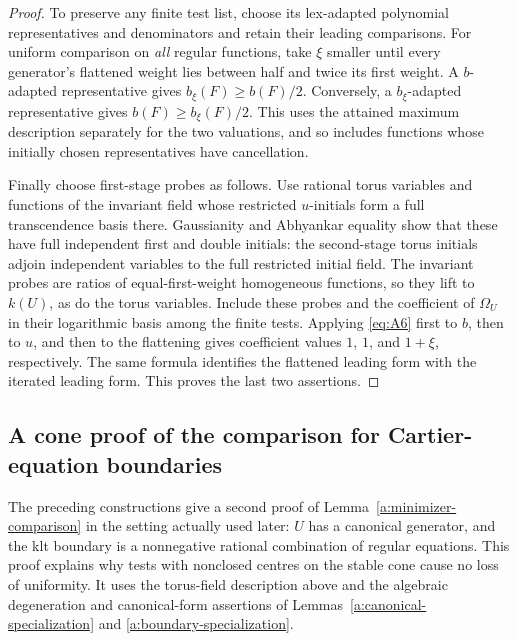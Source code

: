 \begin{proof}
To preserve any finite test list, choose its lex-adapted polynomial
representatives and denominators and retain their leading comparisons.
For uniform comparison on \emph{all} regular functions, take \(\xi\)
smaller until every generator's flattened weight lies between half and
twice its first weight. A \(b\)-adapted representative gives
\(b_\xi(F)\geq b(F)/2\). Conversely, a \(b_\xi\)-adapted
representative gives \(b(F)\geq b_\xi(F)/2\). This uses the attained
maximum description separately for the two valuations, and so includes
functions whose initially chosen representatives have cancellation.

Finally choose first-stage probes as follows. Use rational torus
variables and functions of the invariant field whose restricted
\(u\)-initials form a full transcendence basis there. Gaussianity and
Abhyankar equality show that these have full independent first and
double initials: the second-stage torus initials adjoin independent
variables to the full restricted initial field. The invariant probes
are ratios of equal-first-weight homogeneous functions, so they lift
to \(k(U)\), as do the torus variables. Include these probes and the
coefficient of \(\Omega_U\) in their logarithmic basis among the finite
tests. Applying \eqref{eq:A6} first to \(b\), then to \(u\), and then
to the flattening gives coefficient values \(1\), \(1\), and
\(1+\xi\), respectively. The same formula identifies the flattened
leading form with the iterated leading form. This proves the last two
assertions.
\end{proof}

\subsection{A cone proof of the comparison for Cartier-equation boundaries}
\label{a:comparison-cone-proof}

The preceding constructions give a second proof of
Lemma~\ref{a:minimizer-comparison} in the setting actually used later:
\(U\) has a canonical generator, and the klt boundary is a nonnegative
rational combination of regular equations. This proof explains why tests
with nonclosed centres on the stable cone cause no loss of uniformity.
It uses the torus-field description above and the algebraic degeneration
and canonical-form assertions of
Lemmas~\ref{a:canonical-specialization} and
\ref{a:boundary-specialization}.

